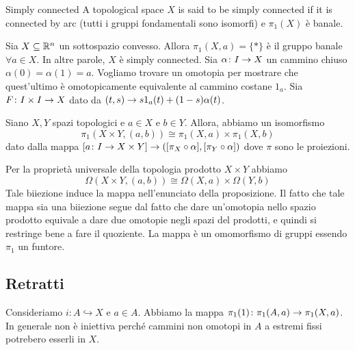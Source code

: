 \documentclass[a4paper]{article}
\begin{document}
\begin{snippetdefinition}{Simply connected}
    A topological space \(X\) is said to be simply connected if it
    is connected by arc (tutti i gruppi fondamentali sono isomorfi)
    e \(\pi_1(X)\) è banale.
\end{snippetdefinition}

\begin{snippetexample}{}
    Sia \(X \subseteq \mathbb{R}^n\) un sottospazio convesso.
    Allora \(\pi_1(X, a) = \{\ast\}\) è il gruppo banale \(\forall a \in X\).
    In altre parole, \(X\) è simply connected.
    Sia \(\alpha \colon I \to X\) un cammino chiuso \(\alpha(0) = \alpha(1) = a\).
    Vogliamo trovare un omotopia per mostrare che quest'ultimo è omotopicamente equivalente al cammino
    costane \(1_a\).
    Sia \(F \colon I \times I \to X\) dato da
    \((t,s) \to s1_a(t) + (1-s)\alpha(t)\).
\end{snippetexample}

\begin{snippetproposition}{}
    Siano \(X, Y\) spazi topologici e \(a \in X\) e \(b \in Y\).
    Allora, abbiamo un isomorfismo
    \[
        \pi_1(X \times Y, (a,b)) \cong \pi_1(X, a) \times \pi_1(X, b)
    \]
    dato dalla mappa \([a \colon I \to X \times Y] \to ([\pi_X \circ \alpha], [\pi_Y \circ \alpha])\)
    dove \(\pi\) sono le proiezioni.
\end{snippetproposition}

\begin{snippetproof}{}
    Per la proprietà universale della topologia prodotto \(X \times Y\)
    abbiamo \[
        \Omega(X \times Y, (a,b))
        \cong \Omega(X, a) \times \Omega(Y, b)    
    \]
    Tale biiezione induce la mappa nell'enunciato della proposizione.
    Il fatto che tale mappa sia una biiezione segue dal fatto che dare un'omotopia nello spazio prodotto
    equivale a dare due omotopie negli spazi del prodotti, e quindi si restringe bene a fare il quoziente.
    La mappa è un omomorfismo di gruppi essendo \(\pi_1\) un funtore.
\end{snippetproof}

\subsection{Retratti}

Consideriamo \(i \colon A \hookrightarrow X\) e \(a \in A\).
Abbiamo la mappa \(\pi_1(1) \colon \pi_1(A, a) \to \pi_1(X, a)\).
In generale non è iniettiva perché cammini non omotopi in \(A\) a estremi fissi potrebero esserli
in \(X\).
\end{document}
